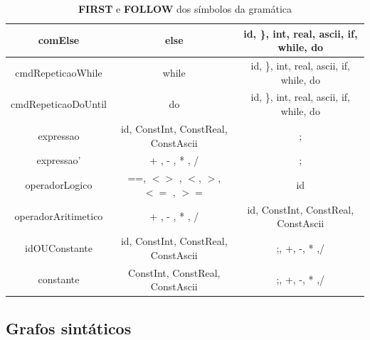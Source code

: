 \documentclass[11pt]{article}
\begin{document}
\begin{table}[H]
\begin{tabular}{c|c|c}
        \hline
        comElse              & else                                & id, \}, int, real, ascii, if, while, do \\
        \hline
        cmdRepeticaoWhile    & while                               & id, \}, int, real, ascii, if, while, do \\
        \hline
        cmdRepeticaoDoUntil  & do                                  & id, \}, int, real, ascii, if, while, do \\
        \hline
        expressao            & id, ConstInt, ConstReal, ConstAscii & ; \\
        \hline
        expressao'           & + , - , * , /                       & ; \\
        \hline
        operadorLogico       & ==, $<>$ , $<$, $>$, $<=$ , $>=$    & id  \\
        \hline
        operadorAritimetico  &  + , - , * , /                      & id, ConstInt, ConstReal, ConstAscii \\
        \hline
        idOUConstante        & id, ConstInt, ConstReal, ConstAscii &  ;, +, -, * ,/ \\
        \hline
        constante            & ConstInt, ConstReal, ConstAscii     &  ;, +, -, * ,/   \\
        \hline
    \end{tabular}
    \caption{\textbf{FIRST} e \textbf{FOLLOW} dos símbolos da gramática}
\end{table}


\subsection*{Grafos sintáticos}
\end{document}
